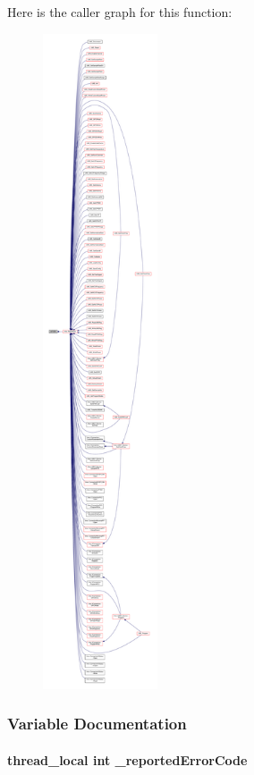 Here is the caller graph for this function\+:
\nopagebreak
\begin{figure}[H]
\begin{center}
\leavevmode
\includegraphics[height=550pt]{d9/df5/Logger_8cpp_ada38bf01d6d691de953ed69268ea6516_icgraph}
\end{center}
\end{figure}




\subsubsection{Variable Documentation}
\paragraph[{\+\_\+reported\+Error\+Code}]{\setlength{\rightskip}{0pt plus 5cm}thread\+\_\+local {\bf int} \+\_\+reported\+Error\+Code}\label{Logger_8cpp_a293345e7ee6195fa82f19f439faea68a}


